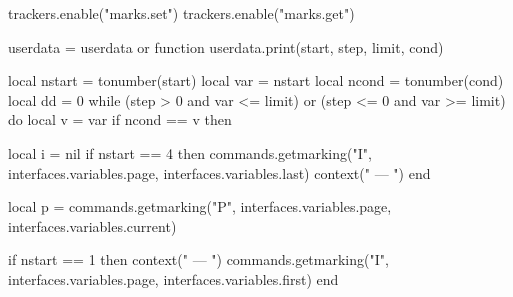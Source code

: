 


    \setupcolors[rgb=no,cmyk=yes,state=start,overprint=yes]


    \setuptolerance[verytolerant] %

    \definetextbackground[ref][
            framecolor=black,
            background=,
        ]



\startlua
trackers.enable("marks.set")
trackers.enable("marks.get")
\stoplua


\startluacode
userdata = userdata or {}
function userdata.print(start, step, limit, cond)
	
	local nstart = tonumber(start)
	local var = nstart
	local ncond = tonumber(cond)
	local dd = 0
	while (step > 0 and var <= limit) or (step <= 0 and var >= limit) 
	do
		local v = var
		if ncond == v 
		then 
		
			local i = nil
			if nstart == 4 then
				commands.getmarking("I", interfaces.variables.page, interfaces.variables.last)
				context(" --- ")
			end
			
			local p = commands.getmarking("P", interfaces.variables.page, interfaces.variables.current)
			
			if nstart == 1 then
				context(" --- ")
				commands.getmarking("I", interfaces.variables.page, interfaces.variables.first)
			end
			
